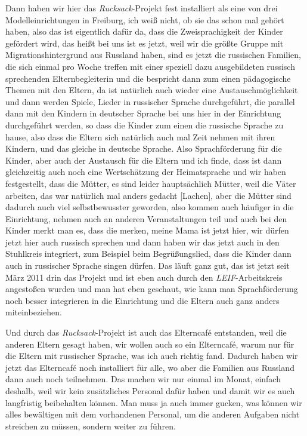 \begin{linenumbers*}
Dann haben wir hier das \emph{Rucksack}-Projekt fest installiert als eine von drei Modelleinrichtungen in Freiburg, ich weiß nicht, ob sie das schon mal gehört haben, also das ist eigentlich dafür da, dass die Zweisprachigkeit der Kinder gefördert wird, das heißt bei uns ist es jetzt, weil wir die größte Gruppe mit Migrationshintergrund aus Russland haben, sind es jetzt die russischen Familien, die sich einmal pro Woche treffen mit einer speziell dazu ausgebildeten russisch sprechenden Elternbegleiterin und die bespricht dann zum einen pädagogische Themen mit den Eltern, da ist natürlich auch wieder eine Austauschmöglichkeit und dann werden Spiele, Lieder in russischer Sprache durchgeführt, die parallel dann mit den Kindern in deutscher Sprache bei uns hier in der Einrichtung durchgeführt werden, so dass die Kinder zum einen die russische Sprache zu hause, also dass die Eltern sich natürlich auch mal Zeit nehmen mit ihren Kindern, und das gleiche in deutsche Sprache. Also Sprachförderung für die Kinder, aber auch der Austausch für die Eltern und ich finde, dass ist dann gleichzeitig auch noch eine Wertschätzung der Heimatsprache und wir haben festgestellt, dass die Mütter, es sind leider hauptsächlich Mütter, weil die Väter arbeiten, das war natürlich mal anders gedacht [Lachen], aber die Mütter sind dadurch auch viel selbstbewusster geworden, also kommen auch häufiger in die Einrichtung, nehmen auch an anderen Veranstaltungen teil und auch bei den Kinder merkt man es, dass die merken, meine Mama ist jetzt hier, wir dürfen jetzt hier auch russisch sprechen und dann haben wir das jetzt auch in den Stuhlkreis integriert, zum Beispiel beim Begrüßungslied, dass die Kinder dann auch in russischer Sprache singen dürfen. Das läuft ganz gut, das ist jetzt seit März 2011 drin das Projekt und ist eben auch durch den \emph{LEIF}-Arbeitskreis angestoßen wurden und man hat eben geschaut, wie kann man Sprachförderung noch besser integrieren in die Einrichtung und die Eltern auch ganz anders miteinbeziehen. 

Und durch das \emph{Rucksack}-Projekt ist auch das Elterncafé entstanden, weil die anderen Eltern gesagt haben, wir wollen auch so ein Elterncafé, warum nur für die Eltern mit russischer Sprache, was ich auch richtig fand. Dadurch haben wir jetzt das Elterncafé noch installiert für alle, wo aber die Familien aus Russland dann auch noch teilnehmen. Das machen wir nur einmal im Monat, einfach deshalb, weil wir kein zusätzliches Personal dafür haben und damit wir es auch langfristig beibehalten können. Man muss ja auch immer gucken, was können wir alles bewältigen mit dem vorhandenen Personal, um die anderen Aufgaben nicht streichen zu müssen, sondern weiter zu führen.   


\end{linenumbers*}
